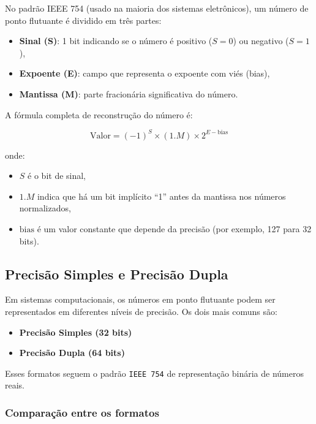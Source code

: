 No padrão IEEE 754 (usado na maioria dos sistemas eletrônicos), um número de ponto flutuante é dividido em três partes:

\begin{itemize}
  \item \textbf{Sinal (S)}: 1 bit indicando se o número é positivo (\( S = 0 \)) ou negativo (\( S = 1 \)),
  \item \textbf{Expoente (E)}: campo que representa o expoente com viés (bias),
  \item \textbf{Mantissa (M)}: parte fracionária significativa do número.
\end{itemize}

A fórmula completa de reconstrução do número é:

\[
\text{Valor} = (-1)^S \times (1.M) \times 2^{E - \text{bias}}
\]

onde:

\begin{itemize}
  \item \( S \) é o bit de sinal,
  \item \( 1.M \) indica que há um bit implícito ``1'' antes da mantissa nos números normalizados,
  \item \( \text{bias} \) é um valor constante que depende da precisão (por exemplo, 127 para 32 bits).
\end{itemize}

\subsection{Precisão Simples e Precisão Dupla}

Em sistemas computacionais, os números em ponto flutuante podem ser representados em diferentes níveis de precisão. Os dois mais comuns são:

\begin{itemize}
  \item \textbf{Precisão Simples (32 bits)}
  \item \textbf{Precisão Dupla (64 bits)}
\end{itemize}

Esses formatos seguem o padrão \texttt{IEEE 754} de representação binária de números reais.

\subsubsection*{Comparação entre os formatos}

